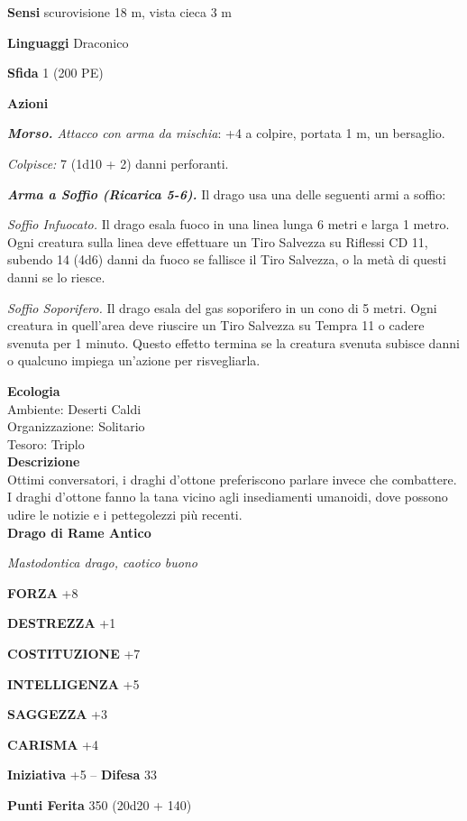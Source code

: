 \begin{multicols}{2}
\textbf{Sensi} scurovisione 18 m, vista cieca 3 m

\textbf{Linguaggi} Draconico

\textbf{Sfida} 1 (200 PE)

\textbf{Azioni}

\emph{\textbf{Morso.} Attacco con arma da mischia}: +4 a colpire, portata 1 m, un bersaglio.

\emph{Colpisce:} 7 (1d10 + 2) danni perforanti.

\emph{\textbf{Arma a Soffio (Ricarica 5-6).}} Il drago usa una delle seguenti armi a soffio:

\emph{Soffio Infuocato.} Il drago esala fuoco in una linea lunga 6 metri e larga 1 metro. Ogni creatura sulla linea deve effettuare un Tiro Salvezza su Riflessi CD 11, subendo 14 (4d6) danni da fuoco se fallisce il Tiro Salvezza, o la metà di questi danni se lo riesce.

\emph{Soffio Soporifero.} Il drago esala del gas soporifero in un cono di 5 metri. Ogni creatura in quell'area deve riuscire un Tiro Salvezza su Tempra 11 o cadere svenuta per 1 minuto. Questo effetto termina se la creatura svenuta subisce danni o qualcuno impiega un'azione per risvegliarla.

\textbf{Ecologia}\\
Ambiente: Deserti Caldi\\
Organizzazione: Solitario\\
Tesoro: Triplo\\
\textbf{Descrizione}\\
Ottimi conversatori, i draghi d'ottone preferiscono parlare invece che combattere. I draghi d'ottone fanno la tana vicino agli insediamenti umanoidi, dove possono udire le notizie e i pettegolezzi più recenti.\\



\medskip{}\textbf{Drago di Rame Antico}

\emph{Mastodontica drago, caotico buono}

\textbf{FORZA} +8

\textbf{DESTREZZA} +1

\textbf{COSTITUZIONE} +7

\textbf{INTELLIGENZA} +5

\textbf{SAGGEZZA} +3

\textbf{CARISMA} +4

\textbf{Iniziativa} +5 -- \textbf{Difesa} 33

\textbf{Punti Ferita} 350 (20d20 + 140) 


\end{multicols}
